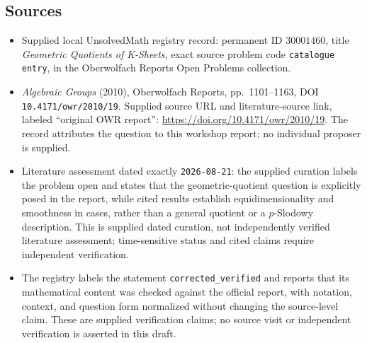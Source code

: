 \documentclass[11pt]{article}
\begin{document}
\subsection{Sources}
\begin{itemize}
\item Supplied local UnsolvedMath registry record: permanent ID \(30001460\), title \emph{Geometric Quotients of K-Sheets}, exact source problem code \texttt{catalogue entry}, in the Oberwolfach Reports Open Problems collection.
\item \emph{Algebraic Groups} (2010), Oberwolfach Reports, pp.\ 1101--1163, DOI \texttt{10.4171/owr/2010/19}. Supplied source URL and literature-source link, labeled ``original OWR report'': \url{https://doi.org/10.4171/owr/2010/19}. The record attributes the question to this workshop report; no individual proposer is supplied.
\item Literature assessment dated exactly \texttt{2026-08-21}: the supplied curation labels the problem open and states that the geometric-quotient question is explicitly posed in the report, while cited results establish equidimensionality and smoothness in cases, rather than a general quotient or a \(p\)-Slodowy description. This is supplied dated curation, not independently verified literature assessment; time-sensitive status and cited claims require independent verification.
\item The registry labels the statement \texttt{corrected\_verified} and reports that its mathematical content was checked against the official report, with notation, context, and question form normalized without changing the source-level claim. These are supplied verification claims; no source visit or independent verification is asserted in this draft.
\end{itemize}
\end{document}
